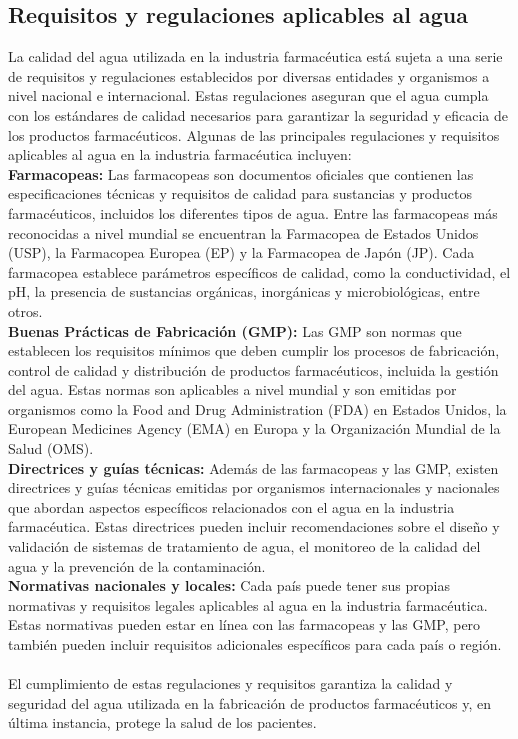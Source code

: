 \subsection{ Requisitos y regulaciones aplicables al agua}

La calidad del agua utilizada en la industria farmacéutica está sujeta a una serie de requisitos y regulaciones establecidos por diversas entidades y organismos a nivel nacional e internacional. Estas regulaciones aseguran que el agua cumpla con los estándares de calidad necesarios para garantizar la seguridad y eficacia de los productos farmacéuticos. Algunas de las principales regulaciones y requisitos aplicables al agua en la industria farmacéutica incluyen:\\ 

\textbf{Farmacopeas:} Las farmacopeas son documentos oficiales que contienen las especificaciones técnicas y requisitos de calidad para sustancias y productos farmacéuticos, incluidos los diferentes tipos de agua. Entre las farmacopeas más reconocidas a nivel mundial se encuentran la Farmacopea de Estados Unidos (USP), la Farmacopea Europea (EP) y la Farmacopea de Japón (JP). Cada farmacopea establece parámetros específicos de calidad, como la conductividad, el pH, la presencia de sustancias orgánicas, inorgánicas y microbiológicas, entre otros. \\ 

\textbf{ Buenas Prácticas de Fabricación (GMP):} Las GMP son normas que establecen los requisitos mínimos que deben cumplir los procesos de fabricación, control de calidad y distribución de productos farmacéuticos, incluida la gestión del agua. Estas normas son aplicables a nivel mundial y son emitidas por organismos como la Food and Drug Administration (FDA) en Estados Unidos, la European Medicines Agency (EMA) en Europa y la Organización Mundial de la Salud (OMS).\\ 

\textbf{ Directrices y guías técnicas:} Además de las farmacopeas y las GMP, existen directrices y guías técnicas emitidas por organismos internacionales y nacionales que abordan aspectos específicos relacionados con el agua en la industria farmacéutica. Estas directrices pueden incluir recomendaciones sobre el diseño y validación de sistemas de tratamiento de agua, el monitoreo de la calidad del agua y la prevención de la contaminación.\\ 

\textbf{ Normativas nacionales y locales:} Cada país puede tener sus propias normativas y requisitos legales aplicables al agua en la industria farmacéutica. Estas normativas pueden estar en línea con las farmacopeas y las GMP, pero también pueden incluir requisitos adicionales específicos para cada país o región.\\\\ 


El cumplimiento de estas regulaciones y requisitos garantiza la calidad y seguridad del agua utilizada en la fabricación de productos farmacéuticos y, en última instancia, protege la salud de los pacientes.
